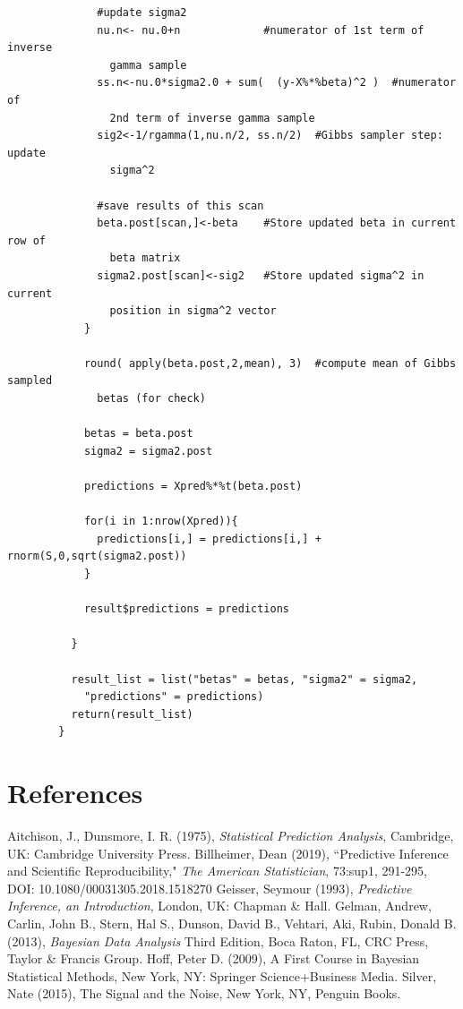 \documentclass[12pt, a4paper]{article}
\begin{document}
\begin{verbatim}
              #update sigma2
              nu.n<- nu.0+n             #numerator of 1st term of inverse
                gamma sample
              ss.n<-nu.0*sigma2.0 + sum(  (y-X%*%beta)^2 )  #numerator of
                2nd term of inverse gamma sample
              sig2<-1/rgamma(1,nu.n/2, ss.n/2)  #Gibbs sampler step:  update
                sigma^2

              #save results of this scan
              beta.post[scan,]<-beta    #Store updated beta in current row of
                beta matrix
              sigma2.post[scan]<-sig2   #Store updated sigma^2 in current
                position in sigma^2 vector
            }

            round( apply(beta.post,2,mean), 3)  #compute mean of Gibbs sampled
              betas (for check)

            betas = beta.post
            sigma2 = sigma2.post

            predictions = Xpred%*%t(beta.post)

            for(i in 1:nrow(Xpred)){
              predictions[i,] = predictions[i,] + rnorm(S,0,sqrt(sigma2.post))
            }

            result$predictions = predictions

          }

          result_list = list("betas" = betas, "sigma2" = sigma2,
            "predictions" = predictions)
          return(result_list)
        }
      \end{verbatim}

      \clearpage

\section{References}


\begin{thebibliography}{6}
 Aitchison, J., Dunsmore, I. R. (1975), \textit{Statistical Prediction Analysis},
Cambridge, UK: Cambridge University Press.
 Billheimer, Dean (2019), ``Predictive Inference and Scientific Reproducibility," \textit{The American Statistician}, 73:sup1, 291-295, DOI: 10.1080/00031305.2018.1518270
 Geisser, Seymour (1993), \textit{Predictive Inference, an Introduction}, London, UK:  Chapman \& Hall.
 Gelman, Andrew, Carlin, John B., Stern, Hal S., Dunson, David B., Vehtari, Aki, Rubin, Donald B. (2013), \textit{Bayesian Data Analysis} Third Edition, Boca Raton, FL, CRC Press, Taylor \& Francis Group.
 Hoff, Peter D. (2009), A First Course in Bayesian Statistical Methods, New York, NY: Springer Science+Business Media.
 Silver, Nate (2015), The Signal and the Noise, New York, NY, Penguin Books.
\end{thebibliography}
\end{document}
